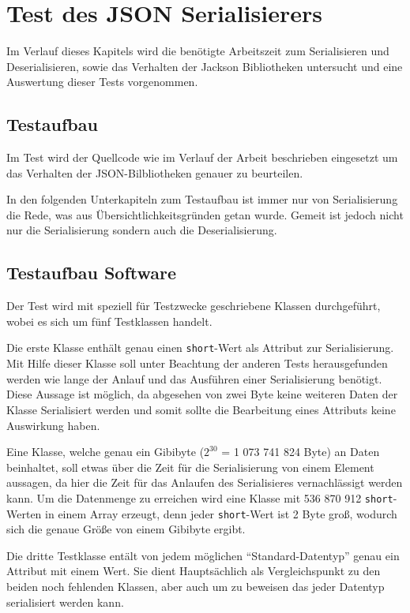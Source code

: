 \section{Test des JSON Serialisierers}
Im Verlauf dieses Kapitels wird die ben\"otigte Arbeitszeit zum Serialisieren und Deserialisieren, sowie das Verhalten der Jackson Bibliotheken untersucht und eine Auswertung dieser Tests vorgenommen.

\subsection{Testaufbau}
Im Test wird der Quellcode wie im Verlauf der Arbeit beschrieben eingesetzt um das Verhalten der JSON-Bilbliotheken genauer zu beurteilen.

In den folgenden Unterkapiteln zum Testaufbau ist immer nur von Serialisierung die Rede, was aus \"Ubersichtlichkeitsgr\"unden getan wurde. Gemeit ist jedoch nicht nur die Serialisierung sondern auch die Deserialisierung.

\subsection{Testaufbau Software}
Der Test wird mit speziell f\"ur Testzwecke geschriebene Klassen durchgef\"uhrt, wobei es sich um f\"unf Testklassen handelt.

Die erste Klasse enth\"alt genau einen \texttt{short}-Wert als Attribut zur Serialisierung. Mit Hilfe dieser Klasse soll unter Beachtung der anderen Tests herausgefunden werden wie lange der Anlauf und das Ausf\"uhren einer Serialisierung ben\"otigt. Diese Aussage ist m\"oglich, da abgesehen von zwei Byte keine weiteren Daten der Klasse Serialisiert werden und somit sollte die Bearbeitung eines Attributs keine Auswirkung haben.

Eine Klasse, welche genau ein Gibibyte ($2^{30}$ = 1 073 741 824 Byte) an Daten beinhaltet, soll etwas \"uber die Zeit f\"ur die Serialisierung von einem Element aussagen, da hier die Zeit f\"ur das Anlaufen des Serialisieres vernachl\"assigt werden kann.
Um die Datenmenge zu erreichen wird eine Klasse mit 536 870 912 \texttt{short}-Werten in einem Array erzeugt, denn jeder \texttt{short}-Wert ist 2 Byte gro\ss{}, wodurch sich die genaue Gr\"o\ss{}e von einem Gibibyte ergibt.

Die dritte Testklasse ent\"alt von jedem m\"oglichen "`Standard-Datentyp"' genau ein Attribut mit einem Wert. Sie dient Haupts\"achlich als Vergleichspunkt zu den beiden noch fehlenden Klassen, aber auch um zu beweisen das jeder Datentyp serialisiert werden kann.

